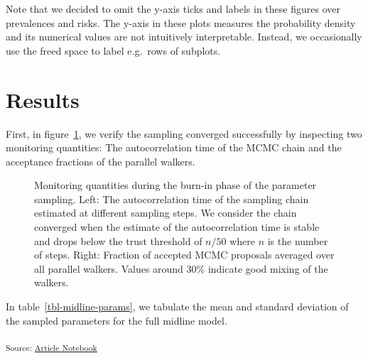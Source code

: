 \documentclass[
  sn-mathphys-num,
]{sn-jnl}
\begin{document}
Note that we decided to omit the y-axis ticks and labels in these
figures over prevalences and risks. The y-axis in these plots measures
the probability density and its numerical values are not intuitively
interpretable. Instead, we occasionally use the freed space to label
e.g.~rows of subplots.

\section{Results}\label{sec-results}

First, in figure~\ref{fig-model-burnin-history}, we verify the sampling
converged successfully by inspecting two monitoring quantities: The
autocorrelation time of the MCMC chain and the acceptance fractions of
the parallel walkers.

\begin{figure}


\caption{\label{fig-model-burnin-history}Monitoring quantities during
the burn-in phase of the parameter sampling. Left: The autocorrelation
time of the sampling chain estimated at different sampling steps. We
consider the chain converged when the estimate of the autocorrelation
time is stable and drops below the trust threshold of \(n/50\) where
\(n\) is the number of steps. Right: Fraction of accepted MCMC proposals
averaged over all parallel walkers. Values around 30\% indicate good
mixing of the walkers.}

\end{figure}%

In table~\ref{tbl-midline-params}, we tabulate the mean and standard
deviation of the sampled parameters for the full midline model.

\textsubscript{Source:
\href{https://rmnldwg.github.io/bilateral-paper/manuscript-preview.html}{Article
Notebook}}
\end{document}
